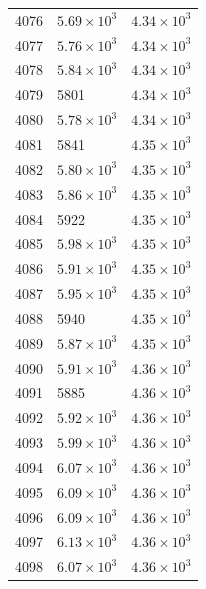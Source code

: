 \begin{table}[H]
\begin{tabular}{lll}
4076 & $\displaystyle 5.69 \times 10^{3}$ & $\displaystyle 4.34 \times 10^{3}$ \\
4077 & $\displaystyle 5.76 \times 10^{3}$ & $\displaystyle 4.34 \times 10^{3}$ \\
4078 & $\displaystyle 5.84 \times 10^{3}$ & $\displaystyle 4.34 \times 10^{3}$ \\
4079 & 5801 & $\displaystyle 4.34 \times 10^{3}$ \\
4080 & $\displaystyle 5.78 \times 10^{3}$ & $\displaystyle 4.34 \times 10^{3}$ \\
4081 & 5841 & $\displaystyle 4.35 \times 10^{3}$ \\
4082 & $\displaystyle 5.80 \times 10^{3}$ & $\displaystyle 4.35 \times 10^{3}$ \\
4083 & $\displaystyle 5.86 \times 10^{3}$ & $\displaystyle 4.35 \times 10^{3}$ \\
4084 & 5922 & $\displaystyle 4.35 \times 10^{3}$ \\
4085 & $\displaystyle 5.98 \times 10^{3}$ & $\displaystyle 4.35 \times 10^{3}$ \\
4086 & $\displaystyle 5.91 \times 10^{3}$ & $\displaystyle 4.35 \times 10^{3}$ \\
4087 & $\displaystyle 5.95 \times 10^{3}$ & $\displaystyle 4.35 \times 10^{3}$ \\
4088 & 5940 & $\displaystyle 4.35 \times 10^{3}$ \\
4089 & $\displaystyle 5.87 \times 10^{3}$ & $\displaystyle 4.35 \times 10^{3}$ \\
4090 & $\displaystyle 5.91 \times 10^{3}$ & $\displaystyle 4.36 \times 10^{3}$ \\
4091 & 5885 & $\displaystyle 4.36 \times 10^{3}$ \\
4092 & $\displaystyle 5.92 \times 10^{3}$ & $\displaystyle 4.36 \times 10^{3}$ \\
4093 & $\displaystyle 5.99 \times 10^{3}$ & $\displaystyle 4.36 \times 10^{3}$ \\
4094 & $\displaystyle 6.07 \times 10^{3}$ & $\displaystyle 4.36 \times 10^{3}$ \\
4095 & $\displaystyle 6.09 \times 10^{3}$ & $\displaystyle 4.36 \times 10^{3}$ \\
4096 & $\displaystyle 6.09 \times 10^{3}$ & $\displaystyle 4.36 \times 10^{3}$ \\
4097 & $\displaystyle 6.13 \times 10^{3}$ & $\displaystyle 4.36 \times 10^{3}$ \\
4098 & $\displaystyle 6.07 \times 10^{3}$ & $\displaystyle 4.36 \times 10^{3}$ \\

\end{tabular}
\end{table}
